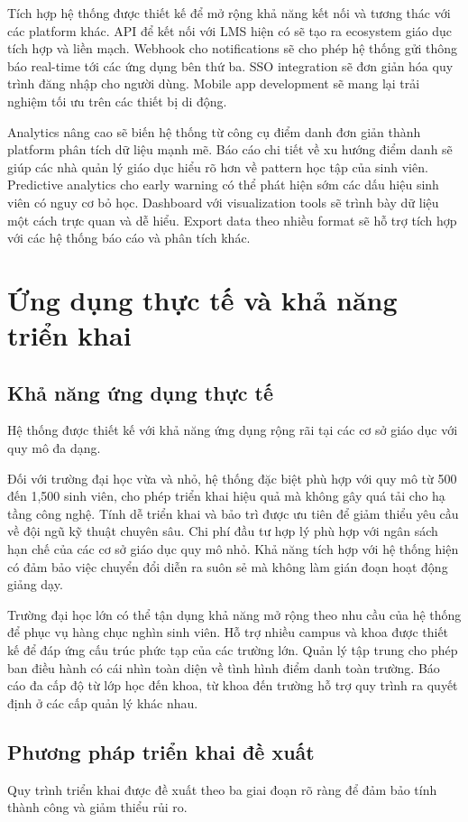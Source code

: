 \documentclass[12pt,a4paper]{report}
\begin{document}
Tích hợp hệ thống được thiết kế để mở rộng khả năng kết nối và tương thác với các platform khác. API để kết nối với LMS hiện có sẽ tạo ra ecosystem giáo dục tích hợp và liền mạch. Webhook cho notifications sẽ cho phép hệ thống gửi thông báo real-time tới các ứng dụng bên thứ ba. SSO integration sẽ đơn giản hóa quy trình đăng nhập cho người dùng. Mobile app development sẽ mang lại trải nghiệm tối ưu trên các thiết bị di động.

Analytics nâng cao sẽ biến hệ thống từ công cụ điểm danh đơn giản thành platform phân tích dữ liệu mạnh mẽ. Báo cáo chi tiết về xu hướng điểm danh sẽ giúp các nhà quản lý giáo dục hiểu rõ hơn về pattern học tập của sinh viên. Predictive analytics cho early warning có thể phát hiện sớm các dấu hiệu sinh viên có nguy cơ bỏ học. Dashboard với visualization tools sẽ trình bày dữ liệu một cách trực quan và dễ hiểu. Export data theo nhiều format sẽ hỗ trợ tích hợp với các hệ thống báo cáo và phân tích khác.

\section{Ứng dụng thực tế và khả năng triển khai}
\subsection{Khả năng ứng dụng thực tế}
Hệ thống được thiết kế với khả năng ứng dụng rộng rãi tại các cơ sở giáo dục với quy mô đa dạng.

Đối với trường đại học vừa và nhỏ, hệ thống đặc biệt phù hợp với quy mô từ 500 đến 1,500 sinh viên, cho phép triển khai hiệu quả mà không gây quá tải cho hạ tầng công nghệ. Tính dễ triển khai và bảo trì được ưu tiên để giảm thiểu yêu cầu về đội ngũ kỹ thuật chuyên sâu. Chi phí đầu tư hợp lý phù hợp với ngân sách hạn chế của các cơ sở giáo dục quy mô nhỏ. Khả năng tích hợp với hệ thống hiện có đảm bảo việc chuyển đổi diễn ra suôn sẻ mà không làm gián đoạn hoạt động giảng dạy.

Trường đại học lớn có thể tận dụng khả năng mở rộng theo nhu cầu của hệ thống để phục vụ hàng chục nghìn sinh viên. Hỗ trợ nhiều campus và khoa được thiết kế để đáp ứng cấu trúc phức tạp của các trường lớn. Quản lý tập trung cho phép ban điều hành có cái nhìn toàn diện về tình hình điểm danh toàn trường. Báo cáo đa cấp độ từ lớp học đến khoa, từ khoa đến trường hỗ trợ quy trình ra quyết định ở các cấp quản lý khác nhau.

\subsection{Phương pháp triển khai đề xuất}
Quy trình triển khai được đề xuất theo ba giai đoạn rõ ràng để đảm bảo tính thành công và giảm thiểu rủi ro.
\end{document}
